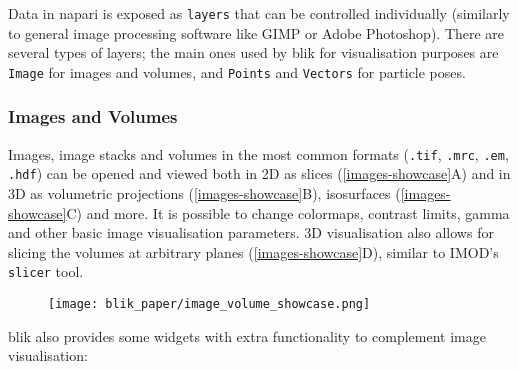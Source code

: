 Data in napari is exposed as \texttt{layers} that can be controlled individually (similarly to general image processing software like GIMP or Adobe Photoshop). There are several types of layers; the main ones used by blik for visualisation purposes are \texttt{Image} for images and volumes, and \texttt{Points} and \texttt{Vectors} for particle poses.

\subsubsection{Images and Volumes}\label{images-and-volumes}

Images, image stacks and volumes in the most common formats (\texttt{.tif}, \texttt{.mrc}, \texttt{.em}, \texttt{.hdf}) can be opened and viewed both in 2D as slices (\autoref{images-showcase}A) and in 3D as volumetric projections (\autoref{images-showcase}B), isosurfaces (\autoref{images-showcase}C) and more. It is possible to change colormaps, contrast limits, gamma and other basic image visualisation parameters. 3D visualisation also allows for slicing the volumes at arbitrary planes (\autoref{images-showcase}D), similar to IMOD's \texttt{slicer} tool.

\begin{figure}[!ht]
    \centering
    \texttt{[image: blik\_paper/image\_volume\_showcase.png]}
    \label{images-showcase}
\end{figure}

blik also provides some widgets with extra functionality to complement image visualisation:


